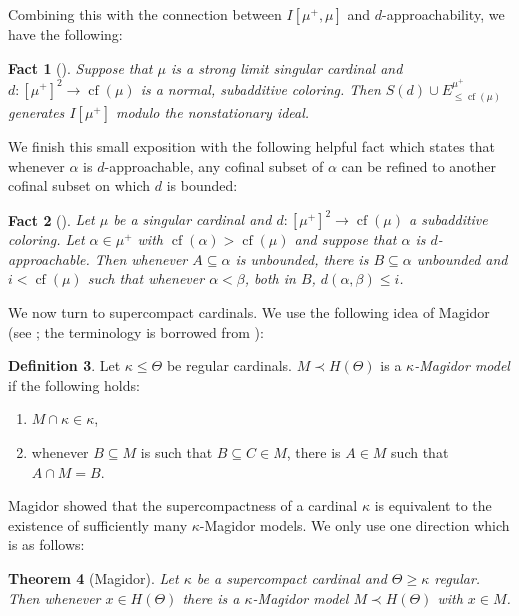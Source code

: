\documentclass[a4paper]{amsart}
\theoremstyle{definition}
\newtheorem{mydef}{Definition}[section]
\theoremstyle{remark}
\theoremstyle{plain}
\newtheorem{mysen}[mydef]{Theorem}
\newtheorem{myfact}[mydef]{Fact}
\numberwithin{mydef}{section}
\DeclareMathOperator{\cf}{cf}
\begin{document}
	Combining this with the connection between $I[\mu^+,\mu]$ and $d$-approachability, we have the following:
	
	\begin{myfact}[{\cite[Corollary 3.35]{EisworthHandbook}}]\label{ColoringCanonical}
		Suppose that $\mu$ is a strong limit singular cardinal and $d\colon[\mu^+]^2\to\cf(\mu)$ is a normal, subadditive coloring. Then $S(d)\cup E_{\leq\cf(\mu)}^{\mu^+}$ generates $I[\mu^+]$ modulo the nonstationary ideal.
	\end{myfact}
	
	We finish this small exposition with the following helpful fact which states that whenever $\alpha$ is $d$-approachable, any cofinal subset of $\alpha$ can be refined to another cofinal subset on which $d$ is bounded:
	
	\begin{myfact}[{\cite[Remark 28]{ShelahSuccSingCard}}]\label{FactRefinement}
		Let $\mu$ be a singular cardinal and $d\colon[\mu^+]^2\to\cf(\mu)$ a subadditive coloring. Let $\alpha\in\mu^+$ with $\cf(\alpha)>\cf(\mu)$ and suppose that $\alpha$ is $d$-approachable. Then whenever $A\subseteq\alpha$ is unbounded, there is $B\subseteq\alpha$ unbounded and $i<\cf(\mu)$ such that whenever $\alpha<\beta$, both in $B$, $d(\alpha,\beta)\leq i$.
	\end{myfact}
	
	We now turn to supercompact cardinals. We use the following idea of Magidor (see \cite{MagidorSuperCompact}; the terminology is borrowed from \cite{MohamVelicGuessingModelsApproach}):
	
	\begin{mydef}
		Let $\kappa\leq\Theta$ be regular cardinals. $M\prec H(\Theta)$ is a \emph{$\kappa$-Magidor model} if the following holds:
		\begin{enumerate}
			\item $M\cap\kappa\in\kappa$,
			\item whenever $B\subseteq M$ is such that $B\subseteq C\in M$, there is $A\in M$ such that $A\cap M=B$.
		\end{enumerate}
	\end{mydef}
	
	Magidor showed that the supercompactness of a cardinal $\kappa$ is equivalent to the existence of sufficiently many $\kappa$-Magidor models. We only use one direction which is as follows:
	
	\begin{mysen}[Magidor]\label{MagModExists}
		Let $\kappa$ be a supercompact cardinal and $\Theta\geq\kappa$ regular. Then whenever $x\in H(\Theta)$ there is a $\kappa$-Magidor model $M\prec H(\Theta)$ with $x\in M$.
	\end{mysen}
	
\end{document}
